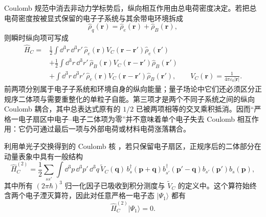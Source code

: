 Coulomb 规范中消去非动力学标势后，纵向相互作用由总电荷密度决定。若把总电荷密度按被显式保留的电子子系统与其余带电环境拆成
\[
\hat\rho_q(\mathbf r)=\hat\rho_e(\mathbf r)+\hat\rho_B(\mathbf r),
\]
则瞬时纵向项可写成
\begin{equation}
\boxed{
\begin{aligned}
\hat H_C={}&\frac12\int\dd^3 r\,\dd^3 r'\,
\hat\rho_e(\mathbf r)V_C(\mathbf r-\mathbf r')\hat\rho_e(\mathbf r')\\
&+\frac12\int\dd^3 r\,\dd^3 r'\,
\hat\rho_B(\mathbf r)V_C(\mathbf r-\mathbf r')\hat\rho_B(\mathbf r')\\
&+\int\dd^3 r\,\dd^3 r'\,
\hat\rho_e(\mathbf r)V_C(\mathbf r-\mathbf r')\hat\rho_B(\mathbf r'),
\qquad
V_C(\mathbf r)=\frac{1}{4\pi\varepsilon_0|\mathbf r|}.
\end{aligned}}
\label{eq:coulomb-subsystem-decomposition-dp75}
\end{equation}
前两项分别属于电子子系统和环境自身的纵向能量；量子场论中它们还必须区分正规序二体项与需要重整化的单粒子自能。第三项才是两个不同子系统之间的纵向 Coulomb 耦合，其中总表达式原有的 $1/2$ 已被两项相等的交叉乘积抵消。因而“严格一电子扇区中电子--电子二体项为零”并不意味着单个电子失去 Coulomb 相互作用：它仍可通过最后一项与外部电荷或材料电荷涨落耦合。

利用单光子交换得到的 Coulomb 核 ，若只保留电子扇区，正规序后的二体部分在动量表象中具有一般结构
\begin{equation}
 \hat H_C^{(2)}
 =\frac12\sum_{ss'}\int\dd^3 p\,\dd^3 p'\,\dd^3 q\,
 \widetilde V_C(\mathbf q)\,
 b_s^\dagger(\mathbf p+\mathbf q)
 b_{s'}^\dagger(\mathbf p'-\mathbf q)
 b_{s'}(\mathbf p')b_s(\mathbf p),
 \label{eq:coulomb-two-body-momentum-r2}
\end{equation}
其中所有 $(2\pi\hbar)^3$ 归一化因子已吸收到积分测度与 $\widetilde V_C$ 的定义中。这个算符始终含两个电子湮灭算符，因此对任意严格一电子态 $|\Psi_1\rangle$ 都有
\begin{equation}
 \boxed{\hat H_C^{(2)}|\Psi_1\rangle=0.}
 \label{eq:one-electron-coulomb-zero-r2}
\end{equation}

